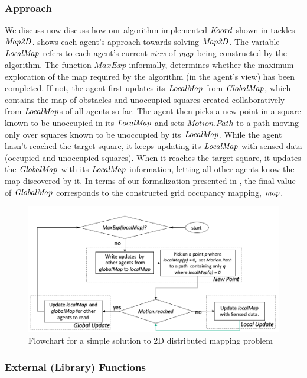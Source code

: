 \subsubsection{Approach}
We discuss now discuss how our algorithm implemented $K\kern-2pt oord$ shown in  tackles $\mathit{Map2D}$.  shows each agent's approach towards solving $\mathit{Map2D}$. The variable $\mathit{LocalMap}$ refers to each agent's current \emph{view} of $\mathit{map}$ being constructed by the algorithm. The function $\mathit{MaxExp}$ informally, determines whether the maximum exploration of the map required by the algorithm (in the agent's view) has been completed. If not, the agent first updates its $\mathit{LocalMap}$ from $\mathit{GlobalMap}$, which contains the map of obstacles and unoccupied squares created collaboratively from $\mathit{LocalMap}$s of all agents so far. The agent then picks a new point in a square known to be unoccupied in its $\mathit{LocalMap}$ and sets $\mathit{Motion.Path}$ to a path moving only over squares known to be unoccupied by its $\mathit{LocalMap}$. While the agent hasn't reached the target square, it keeps updating its $\mathit{LocalMap}$ with sensed data (occupied and unoccupied squares). When it reaches the target square, it updates the $\mathit{GlobalMap}$ with its $\mathit{LocalMap}$ information, letting all other agents know the map discovered by it. In terms of our formalization presented in , the final value of $\mathit{GlobalMap}$ corresponds to the constructed grid occupancy mapping, $\mathit{map}$. 
\begin{figure}[!htbp]
    \centering
    \includegraphics[width=\linewidth]{figs/map_flowchart.png}
    \caption{Flowchart for a simple solution to 2D distributed mapping problem\vspace{-2mm}}
    \label{fig:flowmap}
\end{figure}


\subsubsection{External (Library) Functions}
